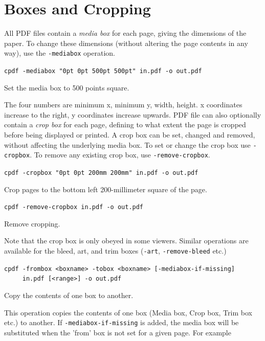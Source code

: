 \documentclass{book}
\begin{document}
  \section{Boxes and Cropping}
  All PDF files contain a \textit{media box} for each page, giving the
dimensions of the paper. To change these dimensions (without altering the page
contents in any way), use the \texttt{-mediabox} operation.
  \begin{framed}
  \noindent\small\verb!cpdf -mediabox "0pt 0pt 500pt 500pt" in.pdf -o out.pdf!

  \vspace{2.5mm}
  \noindent Set the media box to 500 points square.
  \end{framed}
  \noindent The four numbers are minimum x, minimum y, width, height. x
coordinates increase to the right, y coordinates increase upwards.
  PDF file can also optionally contain a \textit{crop box} for each page,
defining to what extent the page is cropped before being displayed or printed.
A crop box can be set, changed and removed, without affecting the underlying
media box. To set or change the crop box use \texttt{-cropbox}. To remove any
existing crop box, use \texttt{-remove-cropbox}.
  \begin{framed}
  \noindent\small\verb!cpdf -cropbox "0pt 0pt 200mm 200mm" in.pdf -o out.pdf!

  \vspace{2.5mm}
  \noindent Crop pages to the bottom left 200-millimeter square of the page.

  \vspace{2.5mm}
  \noindent\verb!cpdf -remove-cropbox in.pdf -o out.pdf!
  
  \vspace{2.5mm}
  \noindent Remove cropping.
  \end{framed}

\noindent Note that the crop box is only obeyed in some viewers. Similar operations are available for the bleed, art, and trim boxes (\texttt{-art}, \texttt{-remove-bleed} etc.)

  \begin{framed}
  \small\noindent\verb!cpdf -frombox <boxname> -tobox <boxname> [-mediabox-if-missing]! \\
  \noindent\verb!     in.pdf [<range>] -o out.pdf!

  \vspace{2.5mm}
  \noindent Copy the contents of one box to another.

  \end{framed}
  \noindent This operation copies the contents of one box (Media box, Crop box, Trim box etc.) to another. If \texttt{-mediabox-if-missing} is added, the media box will be substituted when the 'from' box is not set for a given page. For example
\end{document}
